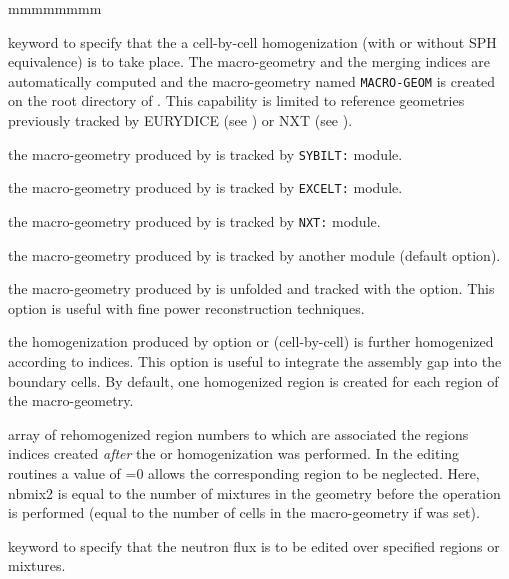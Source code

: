 \begin{ListeDeDescription}{mmmmmmmm}
\item[\moc{CELL}] keyword to specify that the a cell-by-cell homogenization
(with or without SPH equivalence) is to take place. The macro-geometry and the merging indices are automatically
computed and the macro-geometry named {\tt MACRO-GEOM} is created on the root directory of . This
capability is limited to reference geometries previously tracked by EURYDICE (see ) or NXT (see 
).

\item[\moc{SYBIL}] the macro-geometry produced by  is tracked by {\tt SYBILT:} module.

\item[\moc{EXCELL}] the macro-geometry produced by  is tracked by {\tt EXCELT:} module.

\item[\moc{NXT}] the macro-geometry produced by  is tracked by {\tt NXT:} module.

\item[\moc{DEFAULT}] the macro-geometry produced by  is tracked by another module (default option).

\item[\moc{UNFOLD}] the macro-geometry produced by  is unfolded and tracked with the  option. This option is
useful with fine power reconstruction techniques.

\item[\moc{REMIX}] the homogenization produced by option   or   (cell-by-cell) is further
homogenized according to  indices. This option is useful to integrate the assembly gap into the boundary cells. By default, one homogenized region is created
for each region of the macro-geometry.

\item[\dusa{imix2}] array of rehomogenized region numbers to which are associated the regions indices created {\sl after}
the   or   homogenization was performed. In the editing routines a value of =0 allows the corresponding
region to be neglected. Here, nbmix2 is equal to the number of mixtures in the geometry before the  operation is performed (equal to the number
of cells in the macro-geometry if   was set).

\item[\moc{TAKE}] keyword to specify that the neutron flux is to be edited
over specified regions or mixtures. 


\end{ListeDeDescription}

